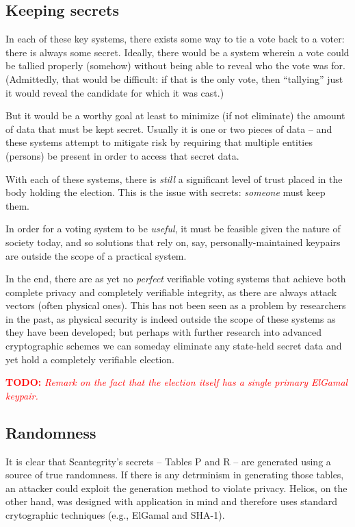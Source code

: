 \documentclass[10pt]{article}
\newcommand{\todo}[1]{\textcolor{red}{\textbf{TODO:} \emph{#1}}}
\begin{document}
\begin{multicols}{2}
\subsection{Keeping secrets}

In each of these key systems, there exists some way to tie a vote back to a voter: there is always
some secret. Ideally, there would be a system wherein a vote could be tallied properly (somehow)
without being able to reveal who the vote was for. (Admittedly, that would be difficult: if that is
the only vote, then ``tallying'' just it would reveal the candidate for which it was cast.)

But it would be a worthy goal at least to minimize (if not eliminate) the amount of data that must
be kept secret. Usually it is one or two pieces of data -- and these systems attempt to mitigate
risk by requiring that multiple entities (persons) be present in order to access that secret data.

With each of these systems, there is \emph{still} a significant level of trust placed in the body
holding the election. This is the issue with secrets: \emph{someone} must keep them.

In order for a voting system to be \emph{useful}, it must be feasible given the nature of society
today, and so solutions that rely on, say, personally-maintained keypairs are outside the scope of
a practical system.

In the end, there are as yet no \emph{perfect} verifiable voting systems that achieve both complete
privacy and completely verifiable integrity, as there are always attack vectors (often physical
ones). This has not been seen as a problem by researchers in the past, as physical security is
indeed outside the scope of these systems as they have been developed; but perhaps with further
research into advanced cryptographic schemes we can someday eliminate any state-held secret data and
yet hold a completely verifiable election.

\todo{Remark on the fact that the election itself has a single primary ElGamal keypair.}

\subsection{Randomness}

It is clear that Scantegrity's secrets -- Tables P and R -- are generated using a source of true
randomness. If there is any detrminism in generating those tables, an attacker could exploit the
generation method to violate privacy. Helios, on the other hand, was designed with application in
mind and therefore uses standard crytographic techniques (e.g., ElGamal and SHA-1).


\end{multicols}
\end{document}
